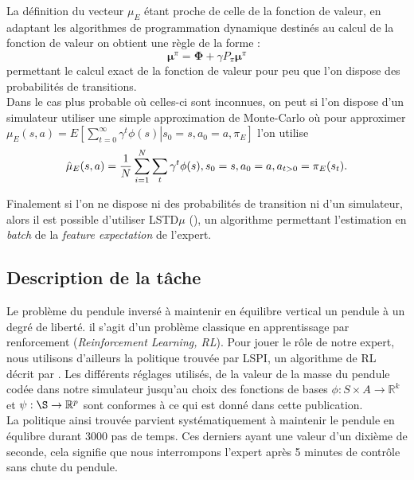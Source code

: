 \documentclass[publibook-draft]{CAp2012}
\begin{document}
{La définition du vecteur $\mu_E$ étant proche de celle de la fonction de valeur, en adaptant les algorithmes de programmation dynamique destinés au calcul de la fonction de valeur on obtient une règle de la forme :
\begin{equation}
\mathbf \mu^\pi = \mathbf\Phi + \gamma P_\pi\mathbf\mu^\pi
\end{equation}
permettant le calcul exact de la fonction de valeur pour peu que l'on dispose des probabilités de transitions.\\

Dans le cas plus probable où celles-ci sont inconnues, on peut si l'on dispose d'un simulateur utiliser une simple approximation de Monte-Carlo où pour approximer $\mu_E(s,a) = E\left.\left[\sum\limits_{t=0}^\infty \gamma^t \phi(s)\right|s_0 = s, a_0 = a, \pi_E\right]$ l'on utilise
\begin{equation}
\hat\mu_E(s,a) = {1\over N}\sum\limits_{i=1}^{N}\sum\limits_{t}\gamma^t\phi(s), s_0=s, a_0=a, a_{t>0} = \pi_E(s_t).
\end{equation}

Finalement si l'on ne dispose ni des probabilités de transition ni d'un simulateur, alors il est possible d'utiliser LSTD$\mu$ (\citep{klein2011batch}), un algorithme permettant l'estimation en {\it batch} de la {\it feature expectation} de l'expert.
\subsection{Description de la tâche}
Le problème du pendule inversé à maintenir en équilibre vertical un pendule à un degré de liberté. il s'agit d'un problème classique en apprentissage par renforcement ({\it Reinforcement Learning, RL}). Pour jouer le rôle de notre expert, nous utilisons d'ailleurs la politique trouvée par LSPI, un algorithme de RL décrit par \citet{lagoudakis2003least}. Les différents réglages utilisés, de la valeur de la masse du pendule codée dans notre simulateur jusqu'au choix des fonctions de bases $\phi : S\times A \rightarrow \mathbb{R}^k$ et $\psi : \S \rightarrow \mathbb{R}^p$ sont conformes à ce qui est donné dans cette publication.\\

La politique ainsi trouvée parvient systématiquement à maintenir le pendule en équlibre durant 3000 pas de temps. Ces derniers ayant une valeur d'un dixième de seconde, cela signifie que nous interrompons l'expert après 5 minutes de contrôle sans chute du pendule.\\

}
\end{document}
